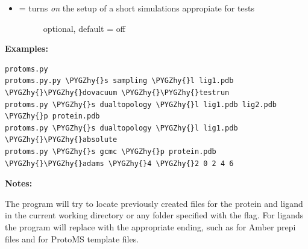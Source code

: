 \documentclass[letterpaper,10pt,english]{sphinxmanual}
\def\PYGZhy{\char`\-}
\begin{document}
\begin{itemize}
\begin{description}
\end{description}

\item {} \begin{description}
\item[{ = turns \emph{on} the setup of a short simulations appropiate for tests}] \leavevmode
optional, default = off

\end{description}

\end{itemize}

\textbf{Examples:}

\begin{Verbatim}[frame=single,commandchars=\\\{\}]
protoms.py
protoms.py.py \PYGZhy{}s sampling \PYGZhy{}l lig1.pdb \PYGZhy{}\PYGZhy{}dovacuum \PYGZhy{}\PYGZhy{}testrun
protoms.py \PYGZhy{}s dualtopology \PYGZhy{}l lig1.pdb lig2.pdb \PYGZhy{}p protein.pdb
protoms.py \PYGZhy{}s dualtopology \PYGZhy{}l lig1.pdb \PYGZhy{}\PYGZhy{}absolute
protoms.py \PYGZhy{}s gcmc \PYGZhy{}p protein.pdb \PYGZhy{}\PYGZhy{}adams \PYGZhy{}4 \PYGZhy{}2 0 2 4 6
\end{Verbatim}

\textbf{Notes:}

The program will try to locate previously created files for the protein and ligand in the current working directory or any folder specified with the  flag. For ligands the program will replace  with the appropriate ending, such as  for Amber prepi files and  for ProtoMS template files.
\end{document}
